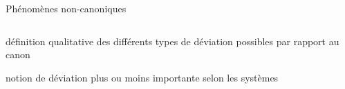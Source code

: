 \begin{frame}[t]{Phénomènes non-canoniques}
     \begin{columns}[t] %
     \begin{column}[T]{5cm} %
\vspace*{-.5cm}
\begin{wideitemize}
\item {}

\begin{smallwideitemize}\scriptsize
\item[\highlightii{+}] définition qualitative des différents types de déviation
  possibles par rapport au canon
\item[\highlightii{+}] notion de déviation plus ou moins importante selon les systèmes






\end{smallwideitemize}
\end{wideitemize}
\end{column}
\end{columns}
\end{frame}
